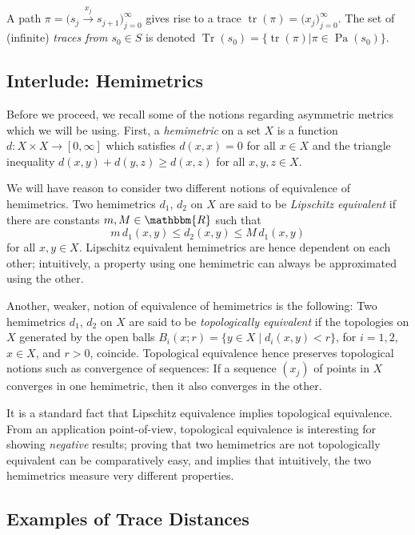 \documentclass[copyright,creativecommons,sharealike]{eptcs}
\theoremstyle{plain}
\newcommand*\Real{\mathbbm{R}}
\DeclareMathOperator{\Tr}{Tr} \DeclareMathOperator{\Pa}{Pa} \DeclareMathOperator{\fPa}{fPa} \DeclareMathOperator{\tr}{tr} \DeclareMathOperator{\len}{len} \newcommand*\bigmid{\mathrel{\big|}}
\newcommand*\tto[1]{\xrightarrow{#1}}
\begin{document}
A path $\pi=\big( s_j\tto{ x_j} s_{ j+ 1}\big)_{ j= 0}^\infty$ gives
rise to a trace $\tr( \pi)=\big( x_j\big)_{ j= 0}^\infty$.  The set of
(infinite) \emph{traces from $s_0\in S$} is denoted $\Tr( s_0)=\big\{
\tr( \pi)\bigmid \pi\in \Pa( s_0)\big\}$.

\subsection{Interlude: Hemimetrics}
\label{se:metrics}

Before we proceed, we recall some of the notions regarding asymmetric
metrics which we will be using.  First, a \emph{hemimetric} on a set
$X$ is a function $d: X\times X\to[ 0, \infty]$ which satisfies $d( x,
x)= 0$ for all $x\in X$ and the triangle inequality $d( x, y)+ d( y,
z)\ge d( x, z)$ for all $x, y, z\in X$.

We will have reason to consider two different notions of equivalence
of hemimetrics. Two hemimetrics $d_1$, $d_2$ on $X$ are said to be
\emph{Lipschitz equivalent} if there are constants $m, M\in \Real$
such that
\begin{equation*}
  m\, d_1( x, y)\le d_2( x, y)\le M\, d_1( x, y)
\end{equation*}
for all $x, y\in X$.  Lipschitz equivalent hemimetrics are hence
dependent on each other; intuitively, a property using one hemimetric
can always be approximated using the other.

Another, weaker, notion of equivalence of hemimetrics is the
following: Two hemimetrics $d_1$, $d_2$ on $X$ are said to be
\emph{topologically equivalent} if the topologies on $X$ generated by
the open balls $B_i( x; r)=\{ y\in X\mid d_i( x, y)< r\}$, for $i= 1,
2$, $x\in X$, and $r> 0$, coincide.  Topological equivalence hence
preserves topological notions such as convergence of sequences: If a
sequence $( x_j)$ of points in $X$ converges in one hemimetric, then
it also converges in the other.

It is a standard fact that Lipschitz equivalence implies topological
equivalence.  From an application point-of-view, topological
equivalence is interesting for showing \emph{negative} results;
proving that two hemimetrics are not topologically equivalent can be
comparatively easy, and implies that intuitively, the two hemimetrics
measure very different properties.

\subsection{Examples of Trace Distances}
\label{sec:trace_distances}
\end{document}
